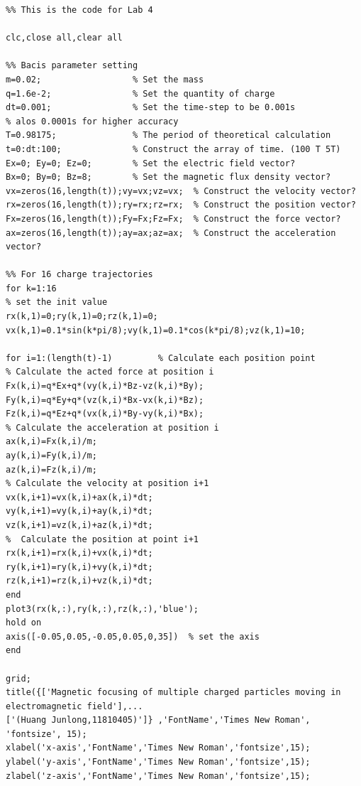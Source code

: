 \documentclass[journal,twocolumn,letterpaper]{IEEEJERM}
\begin{document}
\begin{lstlisting}
%% This is the code for Lab 4

clc,close all,clear all                

%% Bacis parameter setting
m=0.02;                  % Set the mass
q=1.6e-2;                % Set the quantity of charge
dt=0.001;                % Set the time-step to be 0.001s
% alos 0.0001s for higher accuracy
T=0.98175;               % The period of theoretical calculation
t=0:dt:100;              % Construct the array of time. (100 T 5T)
Ex=0; Ey=0; Ez=0;        % Set the electric field vector?
Bx=0; By=0; Bz=8;        % Set the magnetic flux density vector?
vx=zeros(16,length(t));vy=vx;vz=vx;  % Construct the velocity vector?
rx=zeros(16,length(t));ry=rx;rz=rx;  % Construct the position vector?
Fx=zeros(16,length(t));Fy=Fx;Fz=Fx;  % Construct the force vector?
ax=zeros(16,length(t));ay=ax;az=ax;  % Construct the acceleration vector?

%% For 16 charge trajectories
for k=1:16
% set the init value
rx(k,1)=0;ry(k,1)=0;rz(k,1)=0;     
vx(k,1)=0.1*sin(k*pi/8);vy(k,1)=0.1*cos(k*pi/8);vz(k,1)=10;

for i=1:(length(t)-1)         % Calculate each position point 
% Calculate the acted force at position i
Fx(k,i)=q*Ex+q*(vy(k,i)*Bz-vz(k,i)*By);              
Fy(k,i)=q*Ey+q*(vz(k,i)*Bx-vx(k,i)*Bz);              
Fz(k,i)=q*Ez+q*(vx(k,i)*By-vy(k,i)*Bx);   
% Calculate the acceleration at position i
ax(k,i)=Fx(k,i)/m;                              
ay(k,i)=Fy(k,i)/m;                              
az(k,i)=Fz(k,i)/m;                              
% Calculate the velocity at position i+1 
vx(k,i+1)=vx(k,i)+ax(k,i)*dt;                        
vy(k,i+1)=vy(k,i)+ay(k,i)*dt;                        
vz(k,i+1)=vz(k,i)+az(k,i)*dt;                        
%  Calculate the position at point i+1
rx(k,i+1)=rx(k,i)+vx(k,i)*dt;         
ry(k,i+1)=ry(k,i)+vy(k,i)*dt;         
rz(k,i+1)=rz(k,i)+vz(k,i)*dt;         
end
plot3(rx(k,:),ry(k,:),rz(k,:),'blue');       
hold on
axis([-0.05,0.05,-0.05,0.05,0,35])  % set the axis
end

grid;
title({['Magnetic focusing of multiple charged particles moving in electromagnetic field'],...
['(Huang Junlong,11810405)']} ,'FontName','Times New Roman', 'fontsize', 15);           
xlabel('x-axis','FontName','Times New Roman','fontsize',15);                      
ylabel('y-axis','FontName','Times New Roman','fontsize',15);                      
zlabel('z-axis','FontName','Times New Roman','fontsize',15);      


\end{lstlisting}
\end{document}
